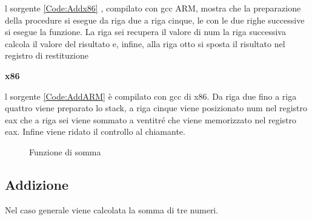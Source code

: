 \documentclass[12pt,a4paper]{report}
\begin{document}
\vspace{0.3 cm}

l sorgente  \ref{Code:Addx86} , compilato con gcc ARM, mostra che la preparazione della procedure si esegue da riga due a riga cinque, le con le due righe successive si esegue la funzione. La riga sei recupera il valore di num la riga successiva calcola il valore del risultato e, infine, alla riga otto si sposta il risultato nel registro di restituzione


\vspace{0.3 cm}
\textbf{x86}

l sorgente  \ref{Code:AddARM} è compilato con gcc di x86.  Da riga due fino a riga quattro viene preparato lo stack, a riga cinque viene posizionato num nel registro eax che a riga sei viene sommato a ventitré che viene memorizzato nel registro eax. Infine viene ridato il controllo al chiamante.

\vspace{0.3 cm}

\begin{figure}[ht]
     
     \begin{subfigure}{0.3\textwidth}
  
        


     \end{subfigure}
     \hfill
     \begin{subfigure}{0.3\textwidth}
         
          


     \end{subfigure}
     \hfill
     \begin{subfigure}{0.3\textwidth}
         
          


     \end{subfigure}
    
        \caption{Funzione di somma}
        
\end{figure}

\subsection{Addizione}
Nel caso generale viene calcolata la somma di tre numeri.

\end{document}
